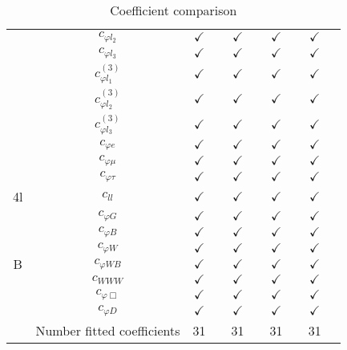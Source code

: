 \documentclass{article}
\begin{document}
\begin{table}[H]
\begin{tabular}{|c|c|c|c|c|c|c|c|c|c|}
 & $c_{\varphi l_2}$ & $\checkmark$ &  & $\checkmark$ &  & $\checkmark$ &  & $\checkmark$ & \\ \cline{2-10}
 & $c_{\varphi l_3}$ & $\checkmark$ &  & $\checkmark$ &  & $\checkmark$ &  & $\checkmark$ & \\ \cline{2-10}
 & $c_{\varphi l_1}^{(3)}$ & $\checkmark$ &  & $\checkmark$ &  & $\checkmark$ &  & $\checkmark$ & \\ \cline{2-10}
 & $c_{\varphi l_2}^{(3)}$ & $\checkmark$ &  & $\checkmark$ &  & $\checkmark$ &  & $\checkmark$ & \\ \cline{2-10}
 & $c_{\varphi l_3}^{(3)}$ & $\checkmark$ &  & $\checkmark$ &  & $\checkmark$ &  & $\checkmark$ & \\ \cline{2-10}
 & $c_{\varphi e}$ & $\checkmark$ &  & $\checkmark$ &  & $\checkmark$ &  & $\checkmark$ & \\ \cline{2-10}
 & $c_{\varphi \mu}$ & $\checkmark$ &  & $\checkmark$ &  & $\checkmark$ &  & $\checkmark$ & \\ \cline{2-10}
 & $c_{\varphi \tau}$ & $\checkmark$ &  & $\checkmark$ &  & $\checkmark$ &  & $\checkmark$ &
\\ \hline
\multirow{1}{*}{4l}
 & $c_{ll}$ & $\checkmark$ &  & $\checkmark$ &  & $\checkmark$ &  & $\checkmark$ &
\\ \hline
\multirow{7}{*}{B}
 & $c_{\varphi G}$ & $\checkmark$ &  & $\checkmark$ &  & $\checkmark$ &  & $\checkmark$ & \\ \cline{2-10}
 & $c_{\varphi B}$ & $\checkmark$ &  & $\checkmark$ &  & $\checkmark$ &  & $\checkmark$ & \\ \cline{2-10}
 & $c_{\varphi W}$ & $\checkmark$ &  & $\checkmark$ &  & $\checkmark$ &  & $\checkmark$ & \\ \cline{2-10}
 & $c_{\varphi WB}$ & $\checkmark$ &  & $\checkmark$ &  & $\checkmark$ &  & $\checkmark$ & \\ \cline{2-10}
 & $c_{WWW}$ & $\checkmark$ &  & $\checkmark$ &  & $\checkmark$ &  & $\checkmark$ & \\ \cline{2-10}
 & $c_{\varphi \Box}$ & $\checkmark$ &  & $\checkmark$ &  & $\checkmark$ &  & $\checkmark$ & \\ \cline{2-10}
 & $c_{\varphi D}$ & $\checkmark$ &  & $\checkmark$ &  & $\checkmark$ &  & $\checkmark$ &
\\ \hline
\hline & Number fitted coefficients & 31 &  & 31 &  & 31 &  & 31 &  \\ \hline
\end{tabular}
\caption{Coefficient comparison}
\end{table}
\end{document}
